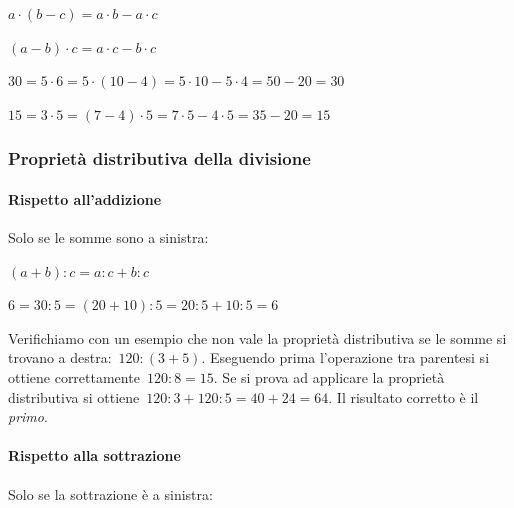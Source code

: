 
\vspace{.5em}
\begin{minipage}{.38\textwidth}
 \(a\cdot (b-c) = a\cdot b - a\cdot c\)
 
 \((a-b)\cdot c = a\cdot c - b\cdot c\)
\end{minipage}
\hfill
\begin{minipage}{.58\textwidth}
 \(30 = 5 \cdot 6 = 5\cdot(10-4) = 5\cdot 10 - 5\cdot 4 = 50 - 20 = 30\)
 
 \(15 = 3 \cdot 5 = (7-4) \cdot 5 = 7\cdot 5 - 4\cdot 5 = 35 - 20 = 15\)
\end{minipage}

\subsubsection{Proprietà distributiva della divisione}

\paragraph{Rispetto all'addizione}
Solo se le somme sono a sinistra:

\vspace{.5em}
\begin{minipage}{.38\textwidth}
 \((a+b): c=a:c+b:c\)
\end{minipage}
\hfill
\begin{minipage}{.58\textwidth}
 \(6 = 30 : 5 = (20+10):5=20:5+10:5=6\)
\end{minipage}

Verifichiamo con un esempio che non vale la proprietà distributiva se le 
somme 
si trovano a destra:~\(120:(3+5)\).
Eseguendo prima l'operazione tra parentesi si ottiene 
correttamente~\(120:8=15\). Se si prova ad applicare
la proprietà distributiva si ottiene~\(120:3+120:5=40+24=64\). 
Il risultato corretto è il \emph{primo}.

\paragraph{Rispetto alla sottrazione}
Solo se la sottrazione è a sinistra:

